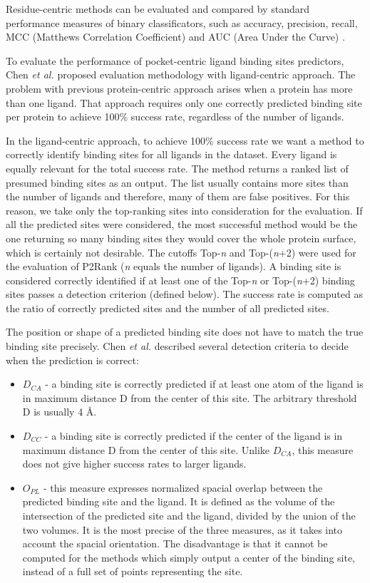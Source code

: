 Residue-centric methods can be evaluated and compared by standard performance measures of binary classificators, such as accuracy, precision, recall, MCC (Matthews Correlation Coefficient) and AUC (Area Under the Curve) \cite{classification}.

To evaluate the performance of pocket-centric ligand binding sites predictors, Chen \textit{et al.} \cite{benchmark} proposed evaluation methodology with ligand-centric approach. The problem with previous protein-centric approach arises when a protein has more than one ligand. That approach requires only one correctly predicted binding site per protein to achieve 100\% success rate, regardless of the number of ligands.

In the ligand-centric approach, to achieve 100\% success rate we want a method to correctly identify binding sites for all ligands in the dataset. Every ligand is equally relevant for the total success rate. The method returns a ranked list of presumed binding sites as an output. The list usually contains more sites than the number of ligands and therefore, many of them are false positives. For this reason, we take only the top-ranking sites into consideration for the evaluation. If all the predicted sites were considered, the most successful method would be the one returning so many binding sites they would cover the whole protein surface, which is certainly not desirable. The cutoffs Top-\textit{n} and Top-(\textit{n}+2) were used for the evaluation of P2Rank \cite{p2rank1} (\textit{n} equals the number of ligands). A binding site is considered correctly identified if at least one of the Top-\textit{n} or Top-(\textit{n}+2) binding sites passes a detection criterion (defined below). The success rate is computed as the ratio of correctly predicted sites and the number of all predicted sites.

The position or shape of a predicted binding site does not have to match the true binding site precisely. Chen \textit{et al.} \cite{benchmark} described several detection criteria to decide when the prediction is correct:

\begin{itemize}
\item $D_{CA}$ - a binding site is correctly predicted if at least one atom of the ligand is in maximum distance D from the center of this site. The arbitrary threshold D is usually 4 {\AA}.
\item $D_{CC}$ - a binding site is correctly predicted if the center of the ligand is in maximum distance D from the center of this site. Unlike $D_{CA}$, this measure does not give higher success rates to larger ligands.
\item $O_{PL}$ - this measure expresses normalized spacial overlap between the predicted binding site and the ligand. It is defined as the volume of the intersection of the predicted site and the ligand, divided by the union of the two volumes. It is the most precise of the three measures, as it takes into account the spacial orientation. The disadvantage is that it cannot be computed for the methods which simply output a center of the binding site, instead of a full set of points representing the site.
\end{itemize}

